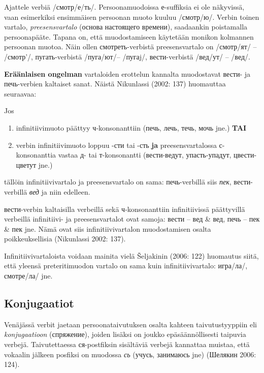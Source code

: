 \documentclass[]{scrartcl}
\providecommand{\tightlist}{%
  \setlength{\itemsep}{0pt}\setlength{\parskip}{0pt}}
\begin{document}
Ajattele verbiä /смотр/е/ть/. Persoonamuodoissa е-suffiksia ei ole
näkyvissä, vaan esimerkiksi ensimmäisen persoonan muoto kuuluu
/смотр/ю/. Verbin toinen vartalo, \emph{preesensvartalo} (основа
настоящего времени), saadaankin poistamalla persoonapääte. Tapana on,
että muodostamiseen käytetään monikon kolmannen persoonan muotoa. Näin
ollen смотреть-verbistä preesensvartalo on /смотр/ят/ -- /смотр'/,
пугать-verbistä /пуга/ют/-- /пугаj/, вести-verbistä /вед/ут/ -- /вед/.

\textbf{Eräänlaisen ongelman} vartaloiden erottelun kannalta muodostavat
вести- ja печь-verbien kaltaiset sanat. Näistä Nikunlassi (2002: 137)
huomauttaa seuraavaa:

Jos

\begin{enumerate}
\def\labelenumi{\alph{enumi}.}
\tightlist
\item
  infinitiivimuoto päättyy ч-konsonanttiin (печь, лечь, течь, мочь jne.)
  \textbf{TAI}
\item
  verbin infinitiivimuoto loppuu -сти tai -сть \textbf{ja}
  preesensvartalossa с-konsonanttia vastaa д- tai т-konsonantti
  (вести-ведут, упасть-упадут, цвести-цветут jne.)
\end{enumerate}

tällöin infinitiivivartalo ja preesensvartalo on sama: печь-verbillä
siis \emph{пек}, вести-verbillä \emph{вед} ja niin edelleen.

вести-verbin kaltaisilla verbeillä sekä ч-konsonanttiin infinitiivissä
päättyvillä verbeillä infinitiivi- ja preesensvartalot ovat samoja:
вести -- вед \& вед, печь -- пек \& пек jne. Nämä ovat siis
infinitiivivartalon muodostamisen osalta poikkeuksellisia (Nikunlassi
2002: 137).

Infinitiivivartaloista voidaan mainita vielä Šeljakinin (2006: 122)
huomautus siitä, että yleensä preteritimuodon vartalo on sama kuin
infinitiivivartalo: игра/ла/, смотре/ла/ jne.

\subsection{Konjugaatiot}\label{konjugaatiot}

Venäjässä verbit jaetaan persoonataivutuksen osalta kahteen
taivutustyyppiin eli \emph{konjugaatioon} (спряжение), joiden lisäksi on
joukko epäsäännöllisesti taipuvia verbejä. Taivutettaessa ся-postfiksin
sisältäviä verbejä kannattaa muistaa, että vokaalin jälkeen posfiksi on
muodossa \emph{сь} (учусь, занимаюсь jne) (Шелякин 2006: 124).
\end{document}
